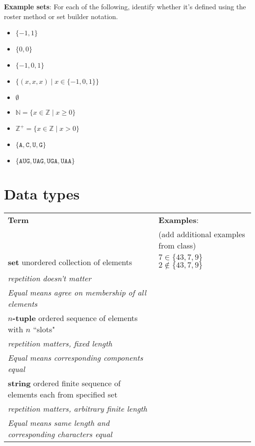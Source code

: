 \documentclass[12pt, oneside]{article}
\newcommand{\A}[0]{\texttt{A}}
\newcommand{\C}[0]{\texttt{C}}
\newcommand{\G}[0]{\texttt{G}}
\newcommand{\U}[0]{\texttt{U}}
\begin{document}
{\bf Example sets}: For each of the following, identify whether it's defined using the roster method
or set builder notation.
\begin{itemize}
    \item[]$\{ -1, 1\}$
    \item[]$\{0, 0 \}$
    \item[]$\{-1, 0, 1 \}$
    \item[]$\{(x,x,x) \mid x \in \{-1,0,1\} \}$
    \item[]$\emptyset$
    \item[]$\mathbb{N} = \{ x \in \mathbb{Z} \mid x \geq 0 \}$
    \item[]$\mathbb{Z}^+ = \{ x \in \mathbb{Z}  \mid x > 0 \}$
    \item[]$\{\A,\C,\U,\G\}$ 
    \item[]$\{\A\U\G, \U\A\G, \U\G\A, \U\A\A \}$
\end{itemize}
\vfill \vfill
\section*{Data types}


\begin{center}
    \begin{tabular}{p{4.4in}p{2.8in}}
    {\bf  Term} & {\bf Examples}:\\
    &  (add additional examples from class)\\
    \hline 
    {\bf set} \newline
    unordered collection of elements & $7 \in \{43, 7, 9 \}$ \qquad $2 \notin \{43, 7, 9 \}$ \\
    {\it repetition doesn't matter} & \\
    {\it Equal means agree on membership of all elements}& \\
    \hline
    {\bf $n$-tuple} \newline
    ordered sequence of elements with $n$ ``slots" & \\
    {\it repetition matters, fixed length} &\\
    {\it Equal means corresponding components equal}& \\
    \hline
    {\bf string} \newline
    ordered finite sequence of elements each from specified
    set & \\
    {\it repetition matters, arbitrary finite length} &\\
    {\it Equal means same length and corresponding characters equal}
    \end{tabular}
    \end{center}

\vfill \vfill
\end{document}
